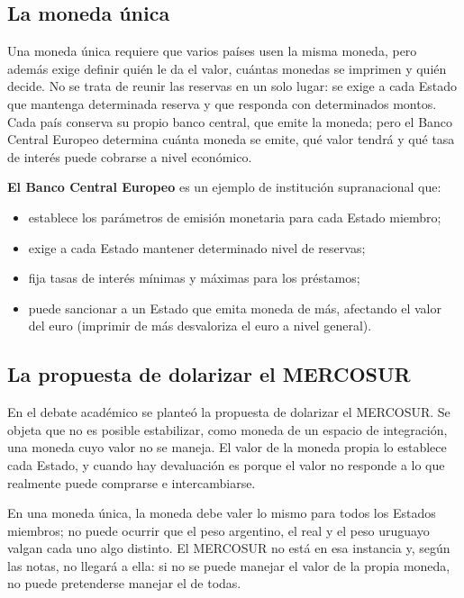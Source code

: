 \documentclass[12pt,oneside]{book}
\begin{document}
\subsection{La moneda única}

Una moneda única requiere que varios países usen la misma moneda, pero además exige definir quién le da el valor, cuántas monedas se imprimen y quién decide. No se trata de reunir las reservas en un solo lugar: se exige a cada Estado que mantenga determinada reserva y que responda con determinados montos. Cada país conserva su propio banco central, que emite la moneda; pero el Banco Central Europeo determina cuánta moneda se emite, qué valor tendrá y qué tasa de interés puede cobrarse a nivel económico.

\begin{important}
\textbf{El Banco Central Europeo} es un ejemplo de institución supranacional que:
\begin{itemize}
    \item establece los parámetros de emisión monetaria para cada Estado miembro;
    \item exige a cada Estado mantener determinado nivel de reservas;
    \item fija tasas de interés mínimas y máximas para los préstamos;
    \item puede sancionar a un Estado que emita moneda de más, afectando el valor del euro (imprimir de más desvaloriza el euro a nivel general).
\end{itemize}
\end{important}

\subsection{La propuesta de dolarizar el MERCOSUR}

En el debate académico se planteó la propuesta de dolarizar el MERCOSUR. Se objeta que no es posible estabilizar, como moneda de un espacio de integración, una moneda cuyo valor no se maneja. El valor de la moneda propia lo establece cada Estado, y cuando hay devaluación es porque el valor no responde a lo que realmente puede comprarse e intercambiarse.

En una moneda única, la moneda debe valer lo mismo para todos los Estados miembros; no puede ocurrir que el peso argentino, el real y el peso uruguayo valgan cada uno algo distinto. El MERCOSUR no está en esa instancia y, según las notas, no llegará a ella: si no se puede manejar el valor de la propia moneda, no puede pretenderse manejar el de todas.
\end{document}
